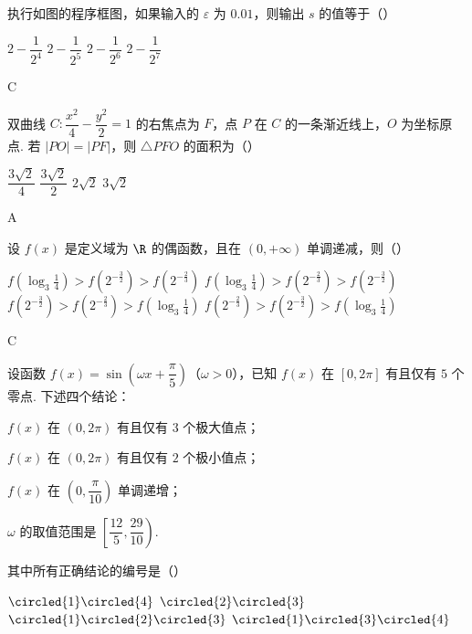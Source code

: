 \begin{problem}
执行如图的程序框图，如果输入的 \(\varepsilon\) 为 \(0.01\)，则输出 \(s\) 的值等于（\quad）


\choices
    {\(2-\dfrac1{2^4}\)}
    {\(2-\dfrac1{2^5}\)}
    {\(2-\dfrac1{2^6}\)}
    {\(2-\dfrac1{2^7}\)}
\end{problem}

\begin{answer}
C
\end{answer}

\begin{problem}
双曲线 \(C:\dfrac{x^2}{4}-\dfrac{y^2}{2}=1\) 的右焦点为 \(F\)，点 \(P\) 在 \(C\) 的一条渐近线上，\(O\) 为坐标原点. 若 \(|PO|=|PF|\)，则 \(\triangle PFO\) 的面积为（\quad）

\choices
    {\(\dfrac{3\sqrt2}{4}\)}
    {\(\dfrac{3\sqrt2}{2}\)}
    {\(2\sqrt2\)}
    {\(3\sqrt2\)}
\end{problem}

\begin{answer}
A
\end{answer}

\begin{problem}
设 \(f(x)\) 是定义域为 \(\R\) 的偶函数，且在 \((0,+\infty)\) 单调递减，则（\quad）

\choices
    {\(f\!\left(\log_3\frac14\right)>f\!\left(2^{-\frac{3}{2}}\right)>f\!\left(2^{-\frac{2}{3}}\right)\)}
    {\(f\!\left(\log_3\frac14\right)>f\!\left(2^{-\frac{2}{3}}\right)>f\!\left(2^{-\frac{3}{2}}\right)\)}
    {\(f\!\left(2^{-\frac{3}{2}}\right)>f\!\left(2^{-\frac{2}{3}}\right)>f\!\left(\log_3\frac14\right)\)}
    {\(f\!\left(2^{-\frac{2}{3}}\right)>f\!\left(2^{-\frac{3}{2}}\right)>f\!\left(\log_3\frac14\right)\)}
\end{problem}

\begin{answer}
C
\end{answer}

\begin{problem}
设函数 \(f(x)=\sin\!\left(\omega x+\dfrac{\pi}{5}\right)\)（\(\omega>0\)），已知 \(f(x)\) 在 \([0,2\pi]\) 有且仅有 \(5\) 个零点. 下述四个结论：

\begin{circlelist}
\item \(f(x)\) 在 \((0,2\pi)\) 有且仅有 \(3\) 个极大值点；
\item \(f(x)\) 在 \((0,2\pi)\) 有且仅有 \(2\) 个极小值点；
    \item \(f(x)\) 在 \(\left(0,\dfrac{\pi}{10}\right)\) 单调递增；
\item \(\omega\) 的取值范围是 \(\left[\dfrac{12}{5},\dfrac{29}{10}\right)\).
\end{circlelist}

其中所有正确结论的编号是（\quad）

\choices
    {\(\circled{1}\circled{4}\)}
    {\(\circled{2}\circled{3}\)}
    {\(\circled{1}\circled{2}\circled{3}\)}
    {\(\circled{1}\circled{3}\circled{4}\)}
\end{problem}

